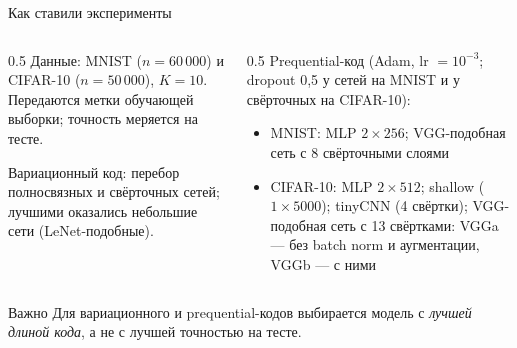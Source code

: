 \documentclass[aspectratio=169,10pt]{beamer}
\begin{document}
\begin{frame}{Как ставили эксперименты}
  \begin{columns}[T]
    \begin{column}{0.5\textwidth}
      \textcolor{structure}{Данные}: MNIST ($n=60\,000$) и CIFAR-10 ($n=50\,000$), $K=10$. Передаются метки обучающей выборки; точность меряется на тесте.

      \medskip
      \textcolor{structure}{Вариационный код}: перебор полносвязных и свёрточных сетей; лучшими оказались небольшие сети (LeNet-подобные).
    \end{column}
    \begin{column}{0.5\textwidth}
      \textcolor{structure}{Prequential-код} (Adam, lr $=10^{-3}$; dropout 0{,}5 у сетей на MNIST и у свёрточных на CIFAR-10):
      \begin{itemize}
        \item MNIST: MLP $2\times256$; VGG-подобная сеть с 8 свёрточными слоями
        \item CIFAR-10: MLP $2\times512$; shallow ($1\times5000$); tinyCNN (4 свёртки); VGG-подобная сеть с 13 свёртками: VGGa --- без batch norm и аугментации, VGGb --- с ними
      \end{itemize}
    \end{column}
  \end{columns}
  \vspace{0.6em}
  \begin{alertblock}{Важно}
    Для вариационного и prequential-кодов выбирается модель с \emph{лучшей длиной кода}, а не с лучшей точностью на тесте.
  \end{alertblock}
\end{frame}
\end{document}
